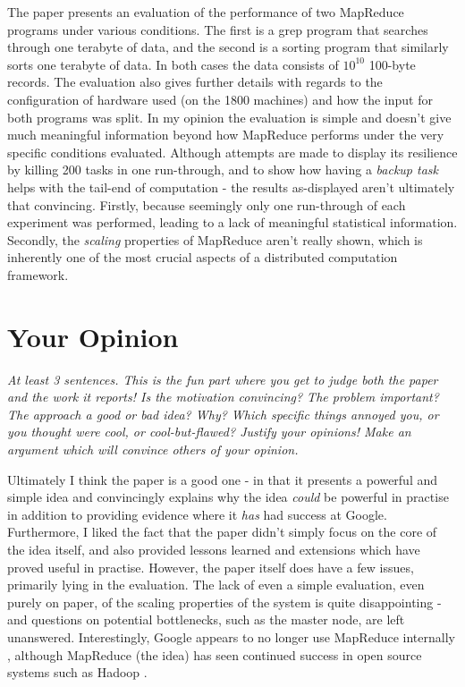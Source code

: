 \documentclass[11pt]{article}
\begin{document}
The paper presents an evaluation of the performance of two MapReduce programs
under various conditions. The first is a grep program that searches through one
terabyte of data, and the second is a sorting program that similarly sorts one
terabyte of data. In both cases the data consists of $10^{10}$ 100-byte
records. The evaluation also gives further details with regards to the
configuration of hardware used (on the 1800 machines) and how the input for
both programs was split. In my opinion the evaluation is simple and doesn't
give much meaningful information beyond how MapReduce performs under the very
specific conditions evaluated. Although attempts are made to display its
resilience by killing 200 tasks in one run-through, and to show how having a
\textit{backup task} helps with the tail-end of computation - the results
as-displayed aren't ultimately that convincing. Firstly, because seemingly only
one run-through of each experiment was performed, leading to a lack of
meaningful statistical information. Secondly, the \textit{scaling} properties
of MapReduce aren't really shown, which is inherently one of the most crucial
aspects of a distributed computation framework.

\section*{Your Opinion}

\textsl{At least 3 sentences. This is the fun part where you get to judge both
the paper and the work it reports! Is the motivation convincing? The problem
important? The approach a good or bad idea? Why? Which specific things annoyed
you, or you thought were cool, or cool-but-flawed? Justify your opinions! Make
an argument which will convince others of your opinion.}

Ultimately I think the paper is a good one - in that it presents a powerful and
simple idea and convincingly explains why the idea \textit{could} be powerful
in practise in addition to providing evidence where it \textit{has} had success
at Google. Furthermore, I liked the fact that the paper didn't simply focus on
the core of the idea itself, and also provided lessons learned and extensions
which have proved useful in practise. However, the paper itself does have a few
issues, primarily lying in the evaluation. The lack of even a simple
evaluation, even purely on paper, of the scaling properties of the system is
quite disappointing - and questions on potential bottlenecks, such as the
master node, are left unanswered. Interestingly, Google appears to no longer
use MapReduce internally \cite{NoMoreMapReduce}, although MapReduce (the idea)
has seen continued success in open source systems such as Hadoop \cite{Hadoop}.
\end{document}
